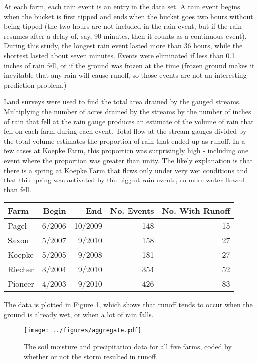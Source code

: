 \documentclass[11pt]{article}
\begin{document}
At each farm, each rain event is an entry in the data set. A rain event begins when the bucket is first tipped and ends when the bucket goes two hours without being tipped (the two hours are not included in the rain event, but if the rain resumes after a delay of, say, 90 minutes, then it counts as a continuous event). During this study, the longest rain event lasted more than 36 hours, while the shortest lasted about seven minutes. Events were eliminated if less than 0.1 inches of rain fell, or if the ground was frozen at the time (frozen ground makes it inevitable that any rain will cause runoff, so those events are not an interesting prediction problem.)\*

Land surveys were used to find the total area drained by the gauged streams. Multiplying the number of acres drained by the streams by the number of inches of rain that fell at the rain gauge produces an estimate of the volume of rain that fell on each farm during each event. Total flow at the stream gauges divided by the total volume estimates the proportion of rain that ended up as runoff. In a few cases at Koepke Farm, this proportion was surprisingly high - including one event where the proportion was greater than unity. The likely explanation is that there is a spring at Koepke Farm that flows only under very wet conditions and that this spring was activated by the biggest rain events, so more water flowed than fell.\*

\vspace{15pt}
\begin{center}
\begin{tabular}{@{}lrrrr@{}} %
Farm & Begin & End & No. Events & No. With Runoff \\
\midrule
Pagel & 6/2006 & 10/2009 & 148 & 15 \\
Saxon & 5/2007 & 9/2010 & 158 & 27 \\
Koepke & 5/2005 & 9/2008 & 181 & 27 \\
Riecher & 3/2004 & 9/2010 & 354 & 52 \\
Pioneer & 4/2003 & 9/2010 & 426 &  83\\
 \end{tabular}
 \end{center}
\vspace{15pt}

The data is plotted in Figure \ref{scatter}, which shows that runoff tends to occur when the ground is already wet, or when a lot of rain falls.\*

\begin{figure}[h!]
	\linespread{1}
	\centering
	\texttt{[image: ../figures/aggregate.pdf]}
	\caption{The soil moisture and precipitation data for all five farms, coded by whether or not the storm resulted in runoff. \label{scatter}}	
	\linespread{2}
\end{figure}
\end{document}
